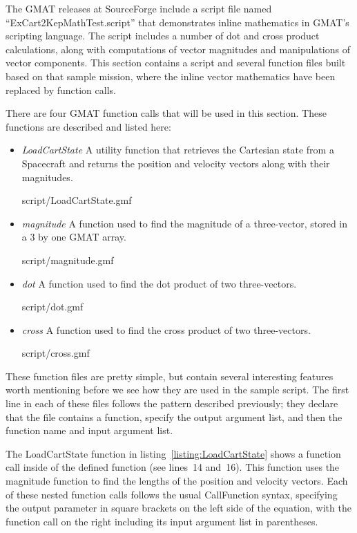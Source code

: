 The GMAT releases at SourceForge include a script file named ``ExCart2KepMathTest.script'' that
demonstrates inline mathematics in GMAT's scripting language.  The script includes a number of dot
and cross product calculations, along with computations of vector magnitudes and manipulations of
vector components.  This section contains a script and several function files built based on that
sample mission, where the inline vector mathematics have been replaced by function calls.

There are four GMAT function calls that will be used in this section.  These functions are
described and listed here:

\begin{itemize}
 \item \textit{LoadCartState}  A utility function that retrieves the Cartesian state from a
Spacecraft and returns the position and velocity vectors along with their magnitudes.
\lstset{numbers=left}

{script/LoadCartState.gmf}
\lstset{numbers=none}

\item \textit{magnitude}  A function used to find the magnitude of a three-vector, stored in a 3 by
one GMAT array.
\lstset{numbers=left}

{script/magnitude.gmf}
\lstset{numbers=none}

\item \textit{dot}  A function used to find the dot product of two three-vectors.
\lstset{numbers=left}

{script/dot.gmf}
\lstset{numbers=none}

\item \textit{cross}  A function used to find the cross product of two three-vectors.
\lstset{numbers=left}

{script/cross.gmf}
\lstset{numbers=none}
\end{itemize}

These function files are pretty simple, but contain several interesting features worth mentioning
before we see how they are used in the sample script.  The first line in each of these files follows
the pattern described previously; they declare that the file contains a function, specify the output
argument list, and then the function name and input argument list.

The LoadCartState function in listing~\ref{listing:LoadCartState} shows a function call inside of
the defined function (see lines~14 and~16).  This function uses the magnitude function to find the
lengths of the position and velocity vectors.  Each of these nested function calls follows the usual
CallFunction syntax, specifying the output parameter in square brackets on the left side of the
equation, with the function call on the right including its input argument list in parentheses.

